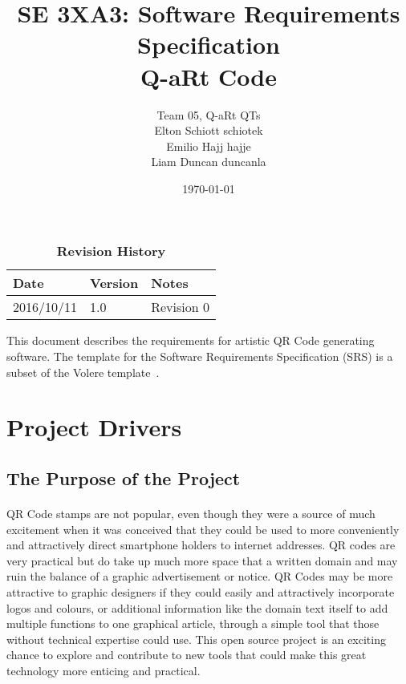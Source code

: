 \documentclass[12pt, titlepage]{article}
\title{SE 3XA3: Software Requirements Specification\\Q-aRt Code}
\author{Team 05, Q-aRt QTs
		\\ Elton Schiott schiotek
		\\ Emilio Hajj hajje
		\\ Liam Duncan duncanla
}
\date{\today}
\begin{document}
\maketitle

\tableofcontents
\listoftables
\listoffigures

\begin{table}[bp]
\caption{\bf Revision History}
\begin{tabularx}{\textwidth}{p{3cm}p{2cm}X}
\toprule {\bf Date} & {\bf Version} & {\bf Notes}\\
\midrule
2016/10/11 & 1.0 & Revision 0\\
\bottomrule
\end{tabularx}
\end{table}

\newpage


This document describes the requirements for artistic QR Code generating 
software.  The template for the Software
Requirements Specification (SRS) is a subset of the Volere
template~\citep{RobertsonAndRobertson2012}.  

\section{Project Drivers}

\subsection{The Purpose of the Project}

	\paragraph{}
		
		QR Code stamps are not popular, even though they were a source of much 
		excitement when it was conceived that they could be used to more 
		conveniently and attractively direct smartphone holders to internet 
		addresses. QR codes are very practical but do take up much more space 
		that a written domain and may ruin the balance of a graphic 
		advertisement or notice. QR Codes may be more attractive to graphic 
		designers if they could easily and attractively incorporate logos and 
		colours, or additional information like the domain text itself to add 
		multiple functions to one graphical article, through a simple tool that 
		those without technical expertise could use. This open source project 
		is an exciting chance to explore and contribute to new tools that could 
		make this great technology more enticing and practical.
\end{document}

